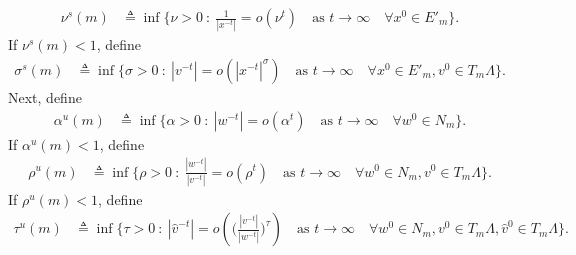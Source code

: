 \documentclass[11pt]{article}
\theoremstyle{remark}
\begin{document}
\begin{align*}
 \nu^s(m) &\triangleq \inf \Big\{\nu>0 \: : \: \frac{1}{|x^{-t}|} = o(\nu^t) \quad \text{as $t \rightarrow \infty$} \quad \forall x^0\in E'_m\Big\}.
 \end{align*}
If  $\nu^s(m)<1$, define
\begin{align*}
 \sigma^s(m) &\triangleq \inf \Big\{\sigma>0 \: : \: |v^{-t}| = o(|x^{-t}|^\sigma) \quad \text{as $t \rightarrow \infty$} \quad \forall x^0\in E'_m, v^0\in T_m\Lambda\Big\}.
 \end{align*}
 Next, define
 \begin{align*}
 \alpha^u(m) &\triangleq \inf \Big\{\alpha>0 \: : \: |w^{-t}| = o(\alpha^t) \quad \text{as $t \rightarrow \infty$}\quad \forall w^0\in N_m\Big\}.
 \end{align*}
If $\alpha^u(m)<1$, define
\begin{align*}
 \rho^u(m) &\triangleq \inf \Big\{\rho>0 \: : \: \frac{|w^{-t}|}{|v^{-t}|} = o(\rho^t) \quad \text{as $t \rightarrow \infty$} \quad \forall w^0\in N_m, v^0\in T_m\Lambda\Big\}.
 \end{align*}
If $\rho^u(m)<1$, define
\begin{align*}
 \tau^u(m) &\triangleq \inf \Big\{\tau>0 \: : \: |\hat{v}^{-t}| = o\left(\Big(\frac{|v^{-t}|}{|w^{-t}|}\Big)^{\tau}\right) \quad \text{as $t \rightarrow \infty$} \quad \forall w^0\in N_m, v^0\in T_m\Lambda,\hat{v}^0\in T_m\Lambda\Big\}.
\end{align*}
\end{document}
